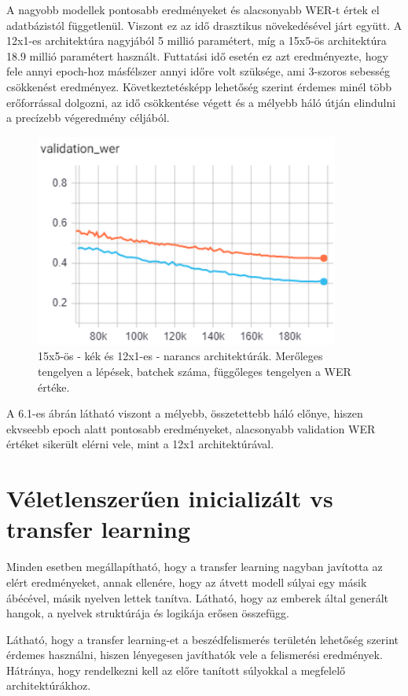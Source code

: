 A nagyobb modellek pontosabb eredményeket és alacsonyabb WER-t értek el adatbázistól függetlenül. Viszont ez az idő drasztikus növekedésével járt együtt. A 12x1-es architektúra nagyjából 5 millió paramétert, míg a 15x5-ös architektúra 18.9 millió paramétert használt. Futtatási idő esetén ez azt eredményezte, hogy fele annyi epoch-hoz másfélszer annyi időre volt szüksége, ami 3-szoros sebesség csökkenést eredményez. Következtetésképp lehetőség szerint érdemes minél több erőforrással dolgozni, az idő csökkentése végett és a mélyebb háló útján elindulni a precízebb végeredmény céljából.

\begin{figure}[!ht]
\centering
\includegraphics[width=100mm, keepaspectratio]{figures/architecture_12x1_vs_15x5.png}
\caption{15x5-ös - kék és 12x1-es - narancs architektúrák. Merőleges tengelyen a lépések, batchek száma, függőleges tengelyen a WER értéke.}
\end{figure}

A 6.1-es ábrán látható viszont a mélyebb, összetettebb háló előnye, hiszen ekvseebb epoch alatt pontosabb eredményeket, alacsonyabb validation WER értéket sikerült elérni vele, mint a 12x1 architektúrával.

\section{Véletlenszerűen inicializált vs transfer learning}

Minden esetben megállapítható, hogy a transfer learning nagyban javította az elért eredményeket, annak ellenére, hogy az átvett modell súlyai egy másik ábécével, másik nyelven lettek tanítva.  Látható, hogy az emberek által generált hangok, a nyelvek struktúrája és logikája erősen összefügg.

Látható, hogy a transfer learning-et a beszédfelismerés területén lehetőség szerint érdemes használni, hiszen lényegesen javíthatók vele a felismerési eredmények. Hátránya, hogy rendelkezni kell az előre tanított súlyokkal a megfelelő architektúrákhoz.

